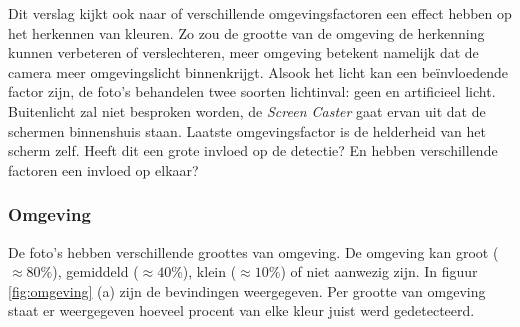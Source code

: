Dit verslag kijkt ook naar of verschillende omgevingsfactoren een effect hebben op het herkennen van kleuren. Zo zou de grootte van de omgeving de herkenning kunnen verbeteren of verslechteren, meer omgeving betekent namelijk dat de camera meer omgevingslicht binnenkrijgt. Alsook het licht kan een beïnvloedende factor zijn, de foto's behandelen twee soorten lichtinval: geen en artificieel licht. Buitenlicht zal niet besproken worden, de {\it Screen Caster} gaat ervan uit dat de schermen binnenshuis staan. Laatste omgevingsfactor is de helderheid van het scherm zelf. Heeft dit een grote invloed op de detectie? En hebben verschillende factoren een invloed op elkaar?

\subsubsection{Omgeving}
De foto's hebben verschillende groottes van omgeving. De omgeving kan groot ($\approx 80\%$), gemiddeld ($\approx 40\%$), klein ($\approx 10\%$) of niet aanwezig zijn. In figuur \ref{fig:omgeving} (a) zijn de bevindingen weergegeven. Per grootte van omgeving staat er weergegeven hoeveel procent van elke kleur juist werd gedetecteerd.

